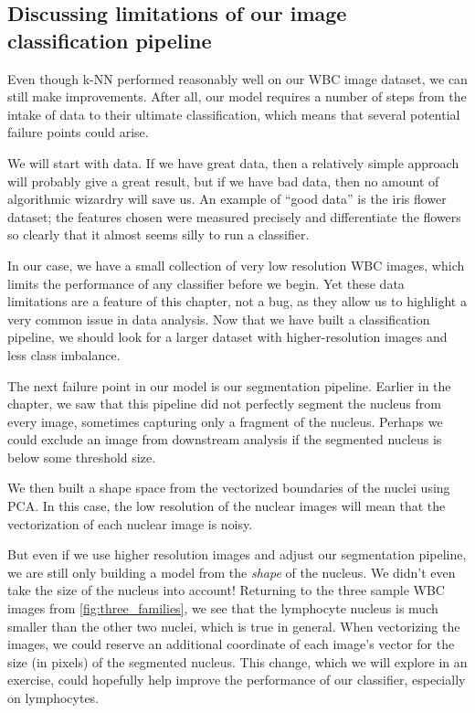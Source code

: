 \FloatBarrier
{}
\subsection{Discussing limitations of our image classification pipeline}

Even though k-NN performed reasonably well on our WBC image dataset, we can still make improvements. After all, our model requires a number of steps from the intake of data to their ultimate classification, which means that several potential failure points could arise.

We will start with data. If we have great data, then a relatively simple approach will probably give a great result, but if we have bad data, then no amount of algorithmic wizardry will save us. An example of ``good data'' is the iris flower dataset; the features chosen were measured precisely and differentiate the flowers so clearly that it almost seems silly to run a classifier.

In our case, we have a small collection of very low resolution WBC images, which limits the performance of any classifier before we begin. Yet these data limitations are a feature of this chapter, not a bug, as they allow us to highlight a very common issue in data analysis. Now that we have built a classification pipeline, we should look for a larger dataset with higher-resolution images and less class imbalance.

The next failure point in our model is our segmentation pipeline. Earlier in the chapter, we saw that this pipeline did not perfectly segment the nucleus from every image, sometimes capturing only a fragment of the nucleus. Perhaps we could exclude an image from downstream analysis if the segmented nucleus is below some threshold size.

We then built a shape space from the vectorized boundaries of the nuclei using PCA. In this case, the low resolution of the nuclear images will mean that the vectorization of each nuclear image is noisy.

But even if we use higher resolution images and adjust our segmentation pipeline, we are still only building a model from the \textit{shape} of the nucleus. We didn't even take the size of the nucleus into account! Returning to the three sample WBC images from \autoref{fig:three_families}, we see that the lymphocyte nucleus is much smaller than the other two nuclei, which is true in general. When vectorizing the images, we could reserve an additional coordinate of each image's vector for the size (in pixels) of the segmented nucleus. This change, which we will explore in an exercise, could hopefully help improve the performance of our classifier, especially on lymphocytes.\\

